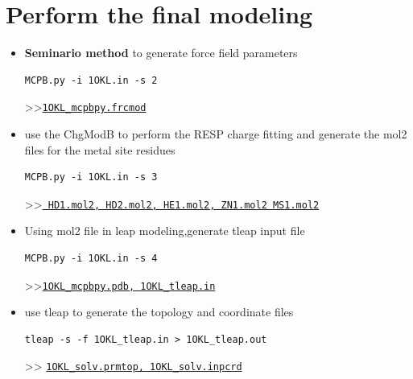 \documentclass[hyperref={breaklinks,colorlinks}]{beamer}
\begin{document}
\section{Perform the final modeling}
\begin{frame}[fragile]
  \begin{itemize}
  \item \textbf{Seminario method} to generate force field parameters
\begin{lstlisting}
MCPB.py -i 1OKL.in -s 2
\end{lstlisting}
    >>\underline{\texttt{1OKL\_mcpbpy.frcmod}}
  \item use the ChgModB to perform the RESP charge fitting and
    generate the mol2 files for the metal site residues
\begin{lstlisting}
MCPB.py -i 1OKL.in -s 3
\end{lstlisting}
    >>\underline{\texttt{ HD1.mol2, HD2.mol2, HE1.mol2, ZN1.mol2
        MS1.mol2}}
  \item Using mol2 file in leap modeling,generate tleap input file
\begin{lstlisting}
MCPB.py -i 1OKL.in -s 4
\end{lstlisting}
    >>\underline{\texttt{1OKL\_mcpbpy.pdb, 1OKL\_tleap.in}}
  \item use tleap to generate the topology and coordinate files
\begin{lstlisting}
tleap -s -f 1OKL_tleap.in > 1OKL_tleap.out
\end{lstlisting}
    >> \underline{\texttt{1OKL\_solv.prmtop, 1OKL\_solv.inpcrd}}
  \end{itemize}
\end{frame}
\end{document}
